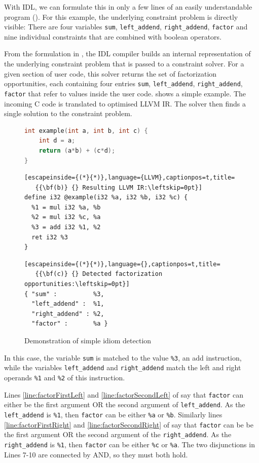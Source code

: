     With IDL, we can formulate this in only a few lines of an easily
    understandable program ().
    For this example, the underlying constraint problem is directly visible:
    There are four variables \texttt{sum}, \texttt{left\_addend},
    \texttt{right\_addend}, \texttt{factor} and nine individual constraints
    that are combined with boolean operators.

    From the formulation in , the IDL compiler builds
    an internal representation of the underlying constraint problem that is
    passed to a constraint solver.
    For a given section of user code, this solver returns the set of
    factorization opportunities, each containing four entries
    \texttt{sum}, \texttt{left\_addend}, \texttt{right\_addend}, \texttt{factor}
    that refer to values inside the user code.
     shows a simple example.
    The incoming C code is translated to optimised LLVM IR.
    The solver then finds a single solution to the constraint problem.

\begin{figure}[ht]
\begin{lstlisting}[language={C++},captionpos=t,title=
   {{\bf(a)} {} Original C code:\leftskip=0pt}]
int example(int a, int b, int c) {
    int d = a;
    return (a*b) + (c*d);
}
\end{lstlisting}
\begin{lstlisting}[escapeinside={(*}{*)},language={LLVM},captionpos=t,title=
   {{\bf(b)} {} Resulting LLVM IR:\leftskip=0pt}]
define i32 @example(i32 %a, i32 %b, i32 %c) {
  %1 = mul i32 %a, %b
  %2 = mul i32 %c, %a
  %3 = add i32 %1, %2
  ret i32 %3
}
\end{lstlisting}
\begin{lstlisting}[escapeinside={(*}{*)},language={},captionpos=t,title=
   {{\bf(c)} {} Detected factorization opportunities:\leftskip=0pt}]
{ "sum" :          %3,
  "left_addend" :  %1,
  "right_addend" : %2,
  "factor" :       %a }
\end{lstlisting}
\caption{Demonstration of simple idiom detection}
\label{fig:firstexample}
\end{figure}

    In this case, the variable {\tt sum} is matched to the value {\tt \%3}, an
    add instruction, while the variables {\tt left\_addend} and
    {\tt right\_addend} match the left and right operands {\tt \%1} and
    {\tt \%2} of this instruction. 

    Lines \ref{line:factorFirstLeft} and \ref{line:factorSecondLeft} of
     say that {\tt factor} can either be the first
    argument OR the second argument of {\tt left\_addend}.
    As the {\tt left\_addend} is {\tt \%1}, then {\tt factor} can be either
    {\tt \%a} or {\tt \%b}.
    Similarly lines \ref{line:factorFirstRight} and
    \ref{line:factorSecondRight} of  say that
    {\tt factor} can be be the first argument OR the second argument of the
    {\tt right\_addend}.
    As the {\tt right\_addend} is {\tt \%1}, then {\tt factor} can be either
    {\tt \%c} or {\tt \%a}.
    The two disjunctions in Lines 7-10 are connected by AND, so they must both
    hold.


